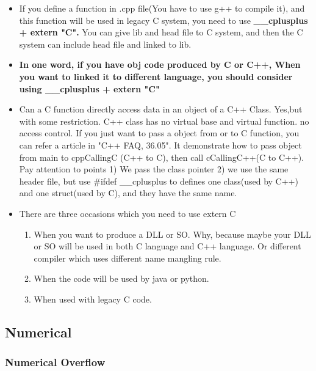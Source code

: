 \documentclass[a4paper,12pt,twoside]{book}
\begin{document}
\begin{itemize}
    \item If you define a function in .cpp file(You have to use g++ to compile it), and this function will be used in legacy C system, you need to use \textbf{\_\_cplusplus + extern "C".}  You can give lib and head file to C system,  and then the C system can include head file and linked to lib.
    
    \item \textbf{In one word, if you have obj code produced by C or C++, When you want to linked it to different language, you should consider using \_\_cplusplus + extern "C" }
    
    \item Can a C function directly access data in an object of a C++ Class. Yes,but with some restriction. C++ class has no virtual base and virtual function. no access control. If you just want to pass a object from or to C function, you can refer a article in "C++ FAQ, 36.05". It demonstrate how to pass object from main to cppCallingC (C++ to C), then call cCallingC++(C to C++). Pay attention to points 1) We pass the class pointer 2) we use the same header file, but use \#ifdef \_\_cplusplus to defines one class(used by C++) and one struct(used by C), and they have the same name.
    
    \item There are three occasions which you need to use extern C
    \begin{enumerate}
        \item When you want to produce a DLL or SO. Why, because maybe your DLL or SO will be used in both C language and C++ language. Or different compiler which uses different name mangling rule.
        
        \item When the code will be used by java or python.
        
        \item When used with legacy C code.
    \end{enumerate}
\end{itemize}


\subsection{Numerical}
\subsubsection{Numerical Overflow}
\end{document}
